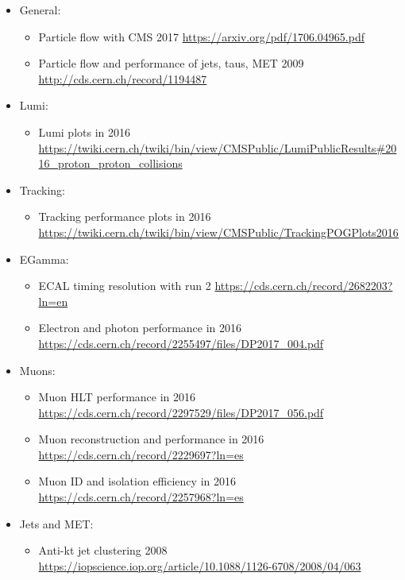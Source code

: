 \begin{itemize}
    \item General:
    \begin{itemize}
        \item Particle flow with CMS 2017
        \url{https://arxiv.org/pdf/1706.04965.pdf}
        \item Particle flow and performance of jets, taus, MET 2009
        \url{http://cds.cern.ch/record/1194487}
    \end{itemize}
    \item Lumi:
    \begin{itemize}
        \item Lumi plots in 2016
        \url{https://twiki.cern.ch/twiki/bin/view/CMSPublic/LumiPublicResults#2016_proton_proton_collisions}
    \end{itemize}
    \item Tracking:
    \begin{itemize}
        \item Tracking performance plots in 2016
        \url{https://twiki.cern.ch/twiki/bin/view/CMSPublic/TrackingPOGPlots2016}
    \end{itemize}
    \item EGamma:
    \begin{itemize}
        \item ECAL timing resolution with run 2
        \url{https://cds.cern.ch/record/2682203?ln=en}
        \item Electron and photon performance in 2016
        \url{https://cds.cern.ch/record/2255497/files/DP2017_004.pdf}
    \end{itemize}
    \item Muons:
    \begin{itemize}
        \item Muon HLT performance in 2016
        \url{https://cds.cern.ch/record/2297529/files/DP2017_056.pdf}
        \item Muon reconstruction and performance in 2016
        \url{https://cds.cern.ch/record/2229697?ln=es}
        \item Muon ID and isolation efficiency in 2016
        \url{https://cds.cern.ch/record/2257968?ln=es}
    \end{itemize}
    \item Jets and MET:
    \begin{itemize}
        \item Anti-kt jet clustering 2008
        \url{https://iopscience.iop.org/article/10.1088/1126-6708/2008/04/063}

\end{itemize}
\end{itemize}

